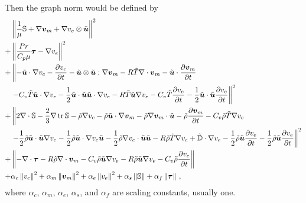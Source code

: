 \documentclass[Proposal.tex]{subfiles}
\begin{document}
Then the graph norm would be defined by
\begin{equation}
\begin{aligned}
&\left\| \frac{1}{\mu}\mathbb{S}+\nabla\boldsymbol v_m+\nabla v_e\otimes\tilde{\boldsymbol u} \right\|^2\\
+&\left\| \frac{Pr}{C_p\mu}\boldsymbol\tau-\nabla v_e \right\|^2\\
+&\left\|
-\tilde{\boldsymbol u}\cdot\nabla v_c-\frac{\partial v_c}{\partial t}-\tilde{\boldsymbol u}\otimes\tilde{\boldsymbol u}:\nabla\boldsymbol v_m
-R\tilde T\nabla\cdot\boldsymbol v_m-\tilde{\boldsymbol u}\cdot\frac{\partial\boldsymbol v_m}{\partial t}\right.\\
&\left.-C_v\tilde T\tilde{\boldsymbol u}\cdot\nabla v_e-\frac{1}{2}\tilde{\boldsymbol u}\cdot\tilde{\boldsymbol u}\tilde{\boldsymbol u}\cdot\nabla v_e
-R\tilde T\tilde{\boldsymbol u}\nabla v_e
-C_v\tilde T\frac{\partial v_e}{\partial t}-\frac{1}{2}\tilde{\boldsymbol u}\cdot\tilde{\boldsymbol u}\frac{\partial v_e}{\partial t}
\right\|^2\\
+&\left\|2\nabla\cdot\mathbb{S}-\frac{2}{3}\nabla\operatorname*{tr}{\mathbb{S}}
-\tilde\rho\nabla v_c
-\tilde\rho\tilde{\boldsymbol u}\cdot\nabla\boldsymbol v_m-\tilde\rho\nabla\boldsymbol v_m\cdot\tilde{\boldsymbol u}
-\tilde\rho\frac{\partial\boldsymbol v_m}{\partial t}
-C_v\tilde\rho\tilde T\nabla v_e\right.\\
&\left.
-\frac{1}{2}\tilde\rho\tilde{\boldsymbol u}\cdot\tilde{\boldsymbol u}\nabla v_e
-\frac{1}{2}\tilde\rho\tilde{\boldsymbol u}\cdot\nabla v_e\tilde{\boldsymbol u}
-\frac{1}{2}\tilde\rho\nabla v_e\cdot\tilde{\boldsymbol u}\tilde{\boldsymbol u}
-R\tilde\rho\tilde T\nabla v_e
+\tilde{\mathbb{D}}\cdot\nabla v_e
-\frac{1}{2}\tilde\rho\tilde{\boldsymbol u}\frac{\partial v_e}{\partial t}
-\frac{1}{2}\tilde\rho\tilde{\boldsymbol u}\frac{\partial v_e}{\partial t}
\right\|^2\\
+&\left\|-\nabla\cdot\boldsymbol\tau
-R\tilde\rho\nabla\cdot\boldsymbol v_m
-C_v\tilde\rho\tilde{\boldsymbol u}\nabla v_e
-R\tilde\rho\tilde{\boldsymbol u}\nabla v_e
-C_v\tilde\rho\frac{\partial v_e}{\partial t}
\right\|\\
+&\alpha_c\left\| v_c \right\|^2
+\alpha_m\left\| \boldsymbol v_m \right\|^2
+\alpha_e\left\| v_e \right\|^2
+\alpha_s\left\| \mathbb{S} \right\|
+\alpha_f\left\| \boldsymbol\tau \right\|
\,,
\end{aligned}
\end{equation}
where $\alpha_c$, $\alpha_m$, $\alpha_e$, $\alpha_s$, and $\alpha_f$ are scaling constants, usually one.
\end{document}
